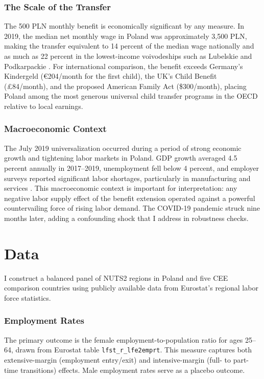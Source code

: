 \documentclass[12pt]{article}
\begin{document}
\subsubsection*{The Scale of the Transfer}  The 500 PLN monthly benefit is economically significant by any measure. In 2019, the median net monthly wage in Poland was approximately 3,500 PLN, making the transfer equivalent to 14 percent of the median wage nationally and as much as 22 percent in the lowest-income voivodeships such as Lubelskie and Podkarpackie \citep{gus2020}. For international comparison, the benefit exceeds Germany's Kindergeld (€204/month for the first child), the UK's Child Benefit (\pounds{}84/month), and the proposed American Family Act (\$300/month), placing Poland among the most generous universal child transfer programs in the OECD relative to local earnings.

\subsubsection*{Macroeconomic Context}  The July 2019 universalization occurred during a period of strong economic growth and tightening labor markets in Poland. GDP growth averaged 4.5 percent annually in 2017--2019, unemployment fell below 4 percent, and employer surveys reported significant labor shortages, particularly in manufacturing and services \citep{oecd2020}. This macroeconomic context is important for interpretation: any negative labor supply effect of the benefit extension operated against a powerful countervailing force of rising labor demand. The COVID-19 pandemic struck nine months later, adding a confounding shock that I address in robustness checks.


\section{Data}

I construct a balanced panel of NUTS2 regions in Poland and five CEE comparison countries using publicly available data from Eurostat's regional labor force statistics.

\subsubsection*{Employment Rates}  The primary outcome is the female employment-to-population ratio for ages 25--64, drawn from Eurostat table \texttt{lfst\_r\_lfe2emprt}. This measure captures both extensive-margin (employment entry/exit) and intensive-margin (full- to part-time transitions) effects. Male employment rates serve as a placebo outcome.
\end{document}
